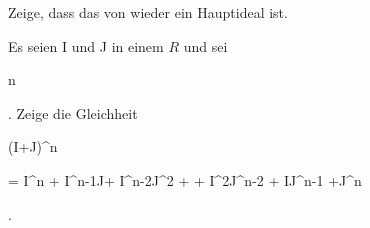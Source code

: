 {} {}




{}


{


Zeige, dass das
von
wieder ein Hauptideal ist.


}


{} {}




{}


{


Es seien
\mathkor {} {I} {und} {J} {}
in einem
$R$ und sei


\mavergleichskette


{\vergleichskette


{ n
}


{ \in }{ \N
}


{  }{
}


{    }{
}


{   }{
}


}
{}{}{.}
Zeige die Gleichheit


\mavergleichskettedisp


{\vergleichskette


{ (I+J)^n
}


{ =} { I^n + I^{n-1}J+ I^{n-2}J^2 + \cdots + I^2J^{n-2} + IJ^{n-1} +J^n
}


{ } {
}


{ } {
}


{ } {
}


}
{}{}{.}


}


{} {}




{}


